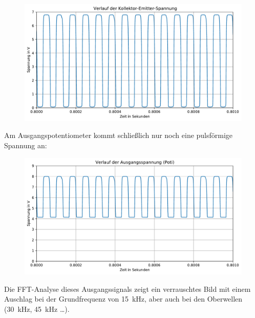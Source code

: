 \begin{figure}[H]
    \centering
    \includegraphics[width = \textwidth]{tex/1_Microphone/pictures/CollectorEmitterVoltage.pdf}
    \label{fig:my_label}
\end{figure}

Am Ausgangspotentiometer kommt schließlich nur noch eine pulsförmige Spannung an: 

\begin{figure}[H]
    \centering
    \includegraphics[width = \textwidth]{tex/1_Microphone/pictures/outputvoltage.pdf}
    \label{fig:my_label}
\end{figure}

Die FFT-Analyse dieses Ausgangssignals zeigt ein verrauschtes Bild mit einem Auschlag bei der Grundfrequenz von \SI{15}{\kilo \hertz}, aber auch bei den Oberwellen (\SI{30}{\kilo \hertz}, \SI{45}{\kilo \hertz} \ldots).

